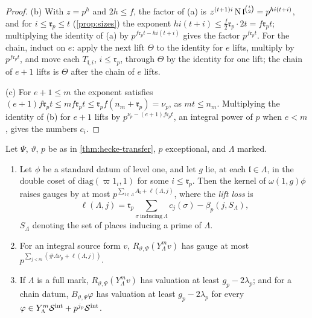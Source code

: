 \begin{proof}
(b) With $z=p^h$ and $2h\le f$, the factor of (a) is $z^{(t+1)i}\operatorname{N}\mathfrak l^{\binom i2}=p^{hi(t+i)}$, and for $i\le\mathfrak r_p\le t$ (\cref{prop:sizes}) the exponent $hi(t+i)\le\frac f2\mathfrak r_p\cdot2t=f\mathfrak r_pt$; multiplying the identity of (a) by $p^{f\mathfrak r_pt-hi(t+i)}$ gives the factor $p^{f\mathfrak r_pt}$. For the chain, induct on $e$: apply the next lift $\Theta$ to the
identity for $e$ lifts, multiply by $p^{f\mathfrak r_pt}$, and move each $T_{\mathfrak l,i}$, $i\le\mathfrak r_p$, through $\Theta$ by the identity for one lift; the chain of $e+1$ lifts is $\Theta$ after the chain of $e$ lifts.

(c) For $e+1\le m$ the exponent satisfies $(e+1)f\mathfrak r_pt\le mf\mathfrak r_pt\le\mathfrak r_pf(n_m+\mathfrak r_p)=\nu_p$, as $mt\le n_m$. Multiplying the identity of (b) for $e+1$ lifts by $p^{\nu_p-(e+1)f\mathfrak r_pt}$, an integral power of $p$ when $e<m$, gives the numbers $c_i$.
\end{proof}

\begin{theorem}\label{thm:marked-valuation}
Let $\Psi$, $\vartheta$, $p$ be as in \cref{thm:hecke-transfer}, $p$ exceptional, and $\Lambda$ marked.
\begin{enumerate}[label=\textup{(\alph*)}]
\item Let $\phi$ be a standard datum of level one, and let $g$ lie, at each $\mathfrak l\in\Lambda$, in the double coset of $\mathrm{diag}(\varpi1_i,1)$ for some $i\le\mathfrak r_p$.
Then the kernel of $\omega(1,g)\phi$ raises gauges by at most $p^{\sum_{\mathfrak l\in\Lambda}A_{\mathfrak l}+\ell(\Lambda,j)}$, where the \emph{lift loss} is
\[
  \ell(\Lambda,j)=\mathfrak r_p\sum_{\sigma\ \text{inducing}\ \Lambda}c_j(\sigma)-\beta_p(j,S_\Lambda),
\]
$S_\Lambda$ denoting the set of places inducing a prime of $\Lambda$.
\item For an integral source form $v$, $R_{\vartheta,\Psi}(Y_\Lambda^mv)$ has gauge at most $p^{\sum_{j<m}(\#\Lambda\nu_p+\ell(\Lambda,j))}$.
\item If $\Lambda$ is a full mark, $R_{\vartheta,\Psi}(Y_\Lambda^mv)$ has valuation at least $g_p-2\lambda_p$; and for a chain datum, $B_{\vartheta,\Psi}\varphi$ has valuation at
least $g_p-2\lambda_p$ for every $\varphi\in Y_\Lambda^m\mathcal S^{\rm int}+p^{j_p}\mathcal S^{\rm int}$.
\end{enumerate}
\end{theorem}

